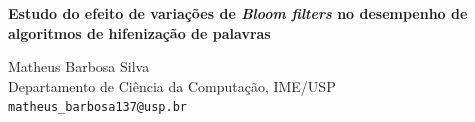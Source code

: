\documentclass[portrait]{ppgcaposter}
\begin{document}
\printheader

\begin{center}
\textbf{\bf\veryHuge\color{NavyBlue}Estudo do efeito de variações de \textit{Bloom filters} no desempenho de algoritmos de hifenização de palavras\\[1.5cm]}


\huge Matheus Barbosa Silva \\[0.3cm]
\huge Departamento de Ciência da Computação, IME/USP\\[0.3cm]
\Large {\tt{matheus\_barbosa137@usp.br}}

 \end{center}

\vspace{2cm}


  



 \Large
\end{document}
